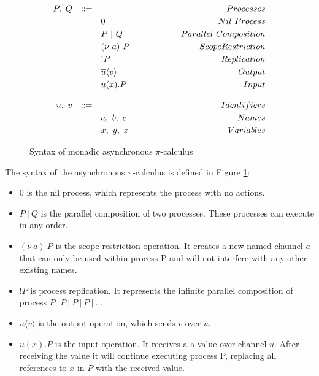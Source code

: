 \documentclass[12pt,twoside]{report}
\newcommand{\white}{\ \ \ \ \ \ \ \ \ \ \ \ }
\begin{document}
\begin{figure}[h]
    \centering
    \begin{equation*}
    \centering
    \begin{array}{rrlcr}
        P,\ Q & ::= && \white & Processes \\[2.75pt]
             &   & 0 & \white & Nil\ Process  \\[2.75pt]
             & | & P\ |\ Q & \white & Parallel\ Composition \\[2.75pt]
             & | & (\nu\ a)\ P & \white & Scope Restriction \\[2.75pt]
             & | & !P & \white  & Replication \\[2.75pt]
             & | & \overline{u}\langle v \rangle & \white & Output \\[2.75pt] 
             & | & u(x).P & \white & Input \\\\
        u,\ v & ::= && \white & Identifiers \\[2.75pt]
              &   & a,\ b,\ c & \white & Names \\[2.75pt]
              & | & x,\ y,\ z & \white & Variables \\
        \end{array}
    \end{equation*}
    \caption{Syntax of monadic asynchronous  $\pi$-calculus}
    \label{picalc_syntax}
\end{figure}{}

The syntax of the asynchronous $\pi$-calculus is defined in Figure \ref{picalc_syntax}:
\begin{itemize}
    \item $0$ is the nil process, which represents the process with no actions.
    \item $P\ |\ Q$ is the parallel composition of two processes. These processes can execute in any order.
    \item $(\nu\ a)\ P$ is the scope restriction operation. It creates a new named channel $a$ that can only be used within process P and will not interfere with any other existing names.
    \item $!P$ is process replication. It represents the infinite parallel composition of process $P$: $P\ |\ P\ |\ P\ |\ ...$
    \item $\overline{u}\langle v \rangle$ is the output operation, which sends $v$ over $u$.
    \item $u(x).P$ is the input operation. It receives a a value over channel $u$. After receiving the value  it will continue executing process P, replacing all references to $x$ in $P$ with the received value.
\end{itemize}
\end{document}
